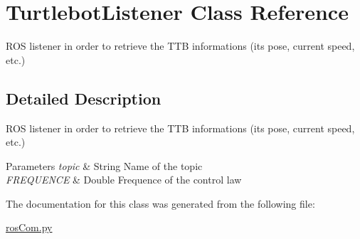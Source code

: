 \hypertarget{classTurtlebotListener}{}\section{Turtlebot\+Listener Class Reference}
\label{classTurtlebotListener}


R\+OS listener in order to retrieve the T\+TB informations (its pose, current speed, etc.)  




\subsection{Detailed Description}
R\+OS listener in order to retrieve the T\+TB informations (its pose, current speed, etc.) 


\begin{DoxyParams}{Parameters}
{\em topic} & String Name of the topic \\
\hline
{\em F\+R\+E\+Q\+U\+E\+N\+CE} & Double Frequence of the control law \\
\hline
\end{DoxyParams}


The documentation for this class was generated from the following file\+:\begin{DoxyCompactItemize}
\item 
\hyperlink{rosCom_8py}{ros\+Com.\+py}\end{DoxyCompactItemize}
